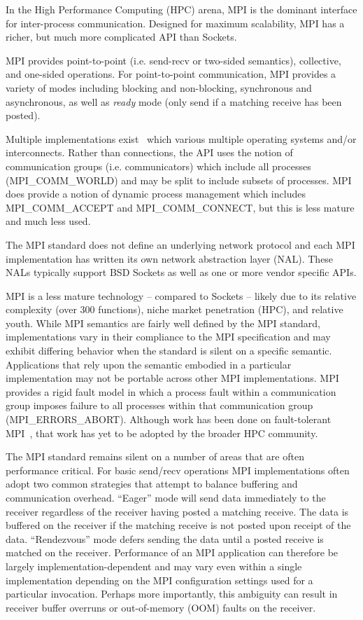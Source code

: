In the High Performance Computing (HPC) arena, MPI is the dominant
interface for inter-process communication. Designed for maximum scalability, MPI has a
richer, but much more complicated API than Sockets.

MPI provides point-to-point (i.e. send-recv or two-sided semantics), collective, and
one-sided operations. For point-to-point communication, MPI provides a variety of modes
including blocking and non-blocking, synchronous and asynchronous, as well as \emph{ready}
mode (only send if a matching receive has been posted).

Multiple implementations exist~\cite{ompi_04_pvmmpi_overview, Gropp:1996:HPI, Liu:2003:RDMA}
which various multiple operating systems and/or interconnects.  Rather than connections,
the API uses the notion of communication groups (i.e.  communicators) which include all
processes ({\sf MPI\_COMM\_WORLD}) and may be split to include subsets of processes. MPI does
provide a notion of dynamic process management which includes {\sf MPI\_COMM\_ACCEPT} and
{\sf MPI\_COMM\_CONNECT}, but this is less mature and much less used.

The MPI standard does not define an underlying network protocol and each MPI
implementation has written its own network abstraction layer (NAL). These NALs typically
support BSD Sockets as well as one or more vendor specific APIs.

MPI is a less mature technology -- compared to Sockets -- likely due to its
relative complexity (over 300 functions), niche market penetration
(HPC), and relative youth. While MPI semantics are fairly well defined
by the MPI standard, implementations vary in their compliance to the
MPI specification and may exhibit differing behavior when the standard is
silent on a specific semantic. Applications that rely upon the
semantic embodied in a particular implementation may not be portable
across other MPI implementations. MPI provides a rigid fault model in
which a process fault within a communication group imposes failure to
all processes within that communication group
({\sf MPI\_ERRORS\_ABORT}). Although work has been done on fault-tolerant
MPI~\cite{fagg04:_fault_toler_commun_librar_applic_high_perof, mpi-ft},
that work has yet to be adopted by the broader HPC community. 

The MPI standard remains silent on a number of areas that are often
performance critical. For basic send/recv operations MPI
implementations often adopt two common strategies that attempt to
balance buffering and communication overhead. ``Eager'' mode will send
data immediately to the receiver regardless of the receiver having
posted a matching receive. The data is buffered on the receiver if the
matching receive is not posted upon receipt of the
data. ``Rendezvous'' mode defers sending the data until a posted
receive is matched on the receiver. Performance of an MPI application
can therefore be largely implementation-dependent and may vary even
within a single implementation depending on the MPI configuration
settings used for a particular invocation. Perhaps more importantly,
this ambiguity can result in receiver buffer overruns or out-of-memory
(OOM) faults on the receiver.

